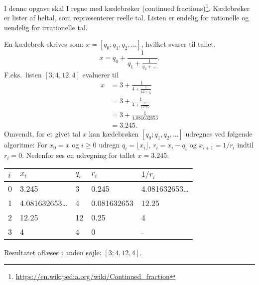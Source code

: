 I denne opgave skal I regne med kædebrøker (continued fractions)\footnote{\url{https://en.wikipedia.org/wiki/Continued_fraction}}. Kædebrøker er lister af heltal, som repræsenterer reelle tal. Listen er endelig for rationelle og uendelig for irrationelle tal. 

En kædebrøk skrives som:
$x = [q_0; q_1, q_2, \ldots]$, hvilket svarer til tallet,
\begin{equation}
  x = q_0 + \frac{1}{q_1 + \frac{1}{q_2 + \dots}}.
\end{equation}
F.eks.\ listen $[3;4, 12, 4]$ evaluerer til
\begin{align}
  x &= 3 + \frac{1}{4 + \frac{1}{12 + \frac{1}{4}}}
  \\&=  3 + \frac{1}{4 + \frac{1}{12.25}}
  \\&=  3 + \frac{1}{4.081632653}
  \\&=  3.245.
\end{align}
Omvendt, for et givet tal $x$ kan kædebrøken $[q_0; q_1, q_2, \ldots]$ udregnes ved følgende algoritme: For $x_0 = x$ og $i \geq 0$ udregn $q_i = \lfloor x_i \rfloor$, $r_i = x_i - q_i$ og $x_{i+1} = 1/r_i$ indtil $r_i = 0$. Nedenfor ses en udregning for tallet $x=3.245$:
\begin{center}
  \begin{tabular}{|l|l|l|l|l|}
    \hline
    $i$ & $x_i$ & $q_i$ & $r_i$ & $1/r_i$\\
    \hline
    0 & 3.245 & 3 & 0.245 & 4.081632653\ldots\\
    1 & 4.081632653\ldots & 4 & 0.081632653 & 12.25\\
    2 & 12.25 & 12 & 0.25 & 4\\
    3 & 4 & 4 & 0 & -\\
    \hline
  \end{tabular}
\end{center}
Resultatet aflæses i anden søjle: $[3; 4, 12, 4]$.

